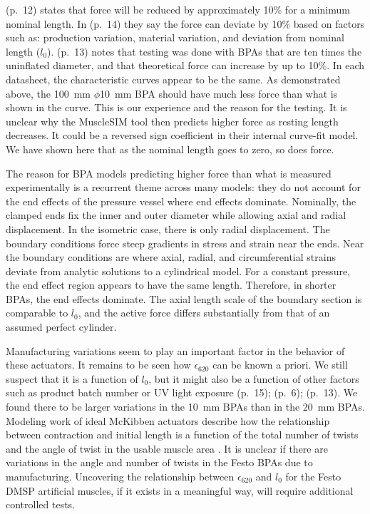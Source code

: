\citet{festo_2026} (p.~12) states that force will be reduced by approximately 10\% for a minimum nominal length. In \citet{festo_2018} (p.~14) they say the force can deviate by 10\% based on factors such as: production variation, material variation, and deviation from nominal length ($l_0$). \citet{festo_2013} (p.~13) notes that testing was done with BPAs that are ten times the uninflated diameter, and that theoretical force can increase by up to 10\%. In each datasheet, the characteristic curves appear to be the same. As demonstrated above, the \qty{100}{\mm} $\phi$\qty{10}{\mm} BPA should have much less force than what is shown in the curve. This is our experience and the reason for the testing. It is unclear why the MuscleSIM tool \citep{lang_robert_musclesim_2005} then predicts higher force as resting length decreases. It could be a reversed sign coefficient in their internal curve-fit model. We have shown here that as the nominal length goes to zero, so does force. 

The reason for BPA models predicting higher force than what is measured experimentally is a recurrent theme across many models: they do not account for the end effects of the pressure vessel where end effects dominate.	Nominally, the clamped ends fix the inner and outer diameter while allowing axial and radial displacement. In the isometric case, there is only radial displacement. The boundary conditions force steep gradients in stress and strain near the ends. Near the boundary conditions are where axial, radial, and circumferential strains deviate from analytic solutions to a cylindrical model. For a constant pressure, the end effect region appears to have the same length. Therefore, in shorter BPAs, the end effects dominate. The axial length scale of the boundary section is comparable to $l_0$,  and the active force differs substantially from that of an assumed perfect cylinder.

Manufacturing variations seem to play an important factor in the behavior of these actuators. It remains to be seen how $\epsilon_{620}$ can be known a priori. We still suspect that it is a function of $l_0$, but it might also be a function of other factors such as product batch number or UV light exposure \citep{festo_2026} (p.~15); \citep{festo_2018} (p.~6); \citep{festo_2013} (p.~13). We found there to be larger variations in the \qtylist{10}{\mm} BPAs than in the \qtylist{20}{\mm} BPAs. Modeling work of ideal McKibben actuators describe how the relationship between contraction and initial length is a function of the total number of twists and the angle of twist in the usable muscle area \citep{chou_measurement_1996}. It is unclear if there are variations in the angle and number of twists in the Festo BPAs due to manufacturing. Uncovering the relationship between $\epsilon_{620}$ and $l_0$ for the Festo DMSP artificial muscles, if it exists in a meaningful way, will require additional controlled tests. 

